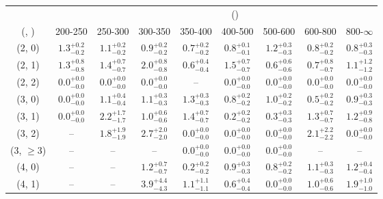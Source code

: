 \begin{table}[h!]
\tiny
\centering
{}
\begin{tabular}
{ccccccccc}
	\hline\hline
&	& \multicolumn{8}{c}{\scalht (\gev)} \\ 
	 (\njet,  \nb) & 200-250 & 250-300 & 300-350 & 350-400 & 400-500 & 500-600 & 600-800 & 800-$\infty$ \\ [0.8ex] 
\hline
	(2, 0) & $1.3^{+ 0.2 }_{- 0.2 }$ & $1.1^{+ 0.2 }_{- 0.2 }$ & $0.9^{+ 0.2 }_{- 0.2 }$ & $0.7^{+ 0.2 }_{- 0.2 }$ & $0.8^{+ 0.1 }_{- 0.1 }$ & $1.2^{+ 0.3 }_{- 0.3 }$ & $0.8^{+ 0.2 }_{- 0.2 }$ & $0.8^{+ 0.3 }_{- 0.3 }$ \\[0.5ex] 
	(2, 1) & $1.3^{+ 0.8 }_{- 0.8 }$ & $1.4^{+ 0.7 }_{- 0.7 }$ & $2.0^{+ 0.8 }_{- 0.8 }$ & $0.6^{+ 0.4 }_{- 0.4 }$ & $1.5^{+ 0.7 }_{- 0.7 }$ & $0.6^{+ 0.6 }_{- 0.6 }$ & $0.7^{+ 0.8 }_{- 0.7 }$ & $1.1^{+ 1.2 }_{- 1.2 }$ \\[0.5ex] 
	(2, 2) & $0.0^{+ 0.0 }_{- 0.0 }$ & $0.0^{+ 0.0 }_{- 0.0 }$ & $0.0^{+ 0.0 }_{- 0.0 }$ & -- & $0.0^{+ 0.0 }_{- 0.0 }$ & $0.0^{+ 0.0 }_{- 0.0 }$ & $0.0^{+ 0.0 }_{- 0.0 }$ & $0.0^{+ 0.0 }_{- 0.0 }$ \\[0.5ex] 
	(3, 0) & $0.0^{+ 0.0 }_{- 0.0 }$ & $1.1^{+ 0.4 }_{- 0.4 }$ & $1.1^{+ 0.3 }_{- 0.3 }$ & $1.3^{+ 0.3 }_{- 0.3 }$ & $0.8^{+ 0.2 }_{- 0.2 }$ & $1.0^{+ 0.2 }_{- 0.2 }$ & $0.5^{+ 0.2 }_{- 0.2 }$ & $0.9^{+ 0.3 }_{- 0.3 }$ \\[0.5ex] 
	(3, 1) & $0.0^{+ 0.0 }_{- 0.0 }$ & $2.2^{+ 1.7 }_{- 1.7 }$ & $1.0^{+ 0.6 }_{- 0.6 }$ & $1.4^{+ 0.7 }_{- 0.7 }$ & $0.2^{+ 0.2 }_{- 0.2 }$ & $0.3^{+ 0.3 }_{- 0.3 }$ & $1.3^{+ 0.7 }_{- 0.7 }$ & $1.2^{+ 0.9 }_{- 0.8 }$ \\[0.5ex] 
	(3, 2) & -- & $1.8^{+ 1.9 }_{- 1.9 }$ & $2.7^{+ 2.0 }_{- 2.0 }$ & $0.0^{+ 0.0 }_{- 0.0 }$ & $0.0^{+ 0.0 }_{- 0.0 }$ & $0.0^{+ 0.0 }_{- 0.0 }$ & $2.1^{+ 2.2 }_{- 2.2 }$ & $0.0^{+ 0.0 }_{- 0.0 }$ \\[0.5ex] 
	(3, $\ge3$) & -- & -- & -- & $0.0^{+ 0.0 }_{- 0.0 }$ & $0.0^{+ 0.0 }_{- 0.0 }$ & $0.0^{+ 0.0 }_{- 0.0 }$ & -- & -- \\[0.5ex] 
	(4, 0) & -- & -- & $1.2^{+ 0.7 }_{- 0.7 }$ & $0.2^{+ 0.2 }_{- 0.2 }$ & $0.9^{+ 0.3 }_{- 0.3 }$ & $0.8^{+ 0.2 }_{- 0.2 }$ & $1.1^{+ 0.3 }_{- 0.3 }$ & $1.2^{+ 0.4 }_{- 0.4 }$ \\[0.5ex] 
	(4, 1) & -- & -- & $3.9^{+ 4.4 }_{- 4.3 }$ & $1.1^{+ 1.1 }_{- 1.1 }$ & $0.6^{+ 0.4 }_{- 0.4 }$ & $0.0^{+ 0.0 }_{- 0.0 }$ & $1.0^{+ 0.6 }_{- 0.6 }$ & $1.9^{+ 1.0 }_{- 1.0 }$ \\[0.5ex] 

\end{tabular}
\end{table}
